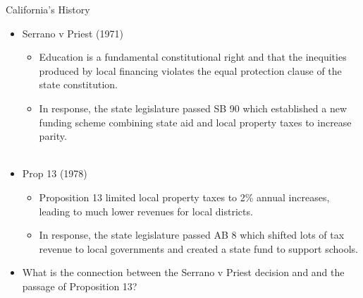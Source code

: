 \documentclass{beamer}
\begin{document}
\begin{frame}[<+->]{California's History}
	\begin{itemize}
		\item Serrano v Priest (1971)
		\begin{itemize}
			\item Education is a fundamental constitutional right and that the inequities produced by local financing violates the equal protection clause of the state constitution. 
			\item In response, the state legislature passed SB 90 which established a new funding scheme combining state aid and local property taxes to increase parity. \\~\\
		\end{itemize}
		\item Prop 13 (1978)
		\begin{itemize}
			\item Proposition 13 limited local property taxes to 2\% annual increases, leading to much lower revenues for local districts. 
			\item In response, the state legislature passed AB 8 which shifted lots of tax revenue to local governments and created a state fund to support schools. 
		\end{itemize}
		\item What is the connection between the Serrano v Priest decision and and the passage of Proposition 13?
	\end{itemize}
\end{frame}
\end{document}
